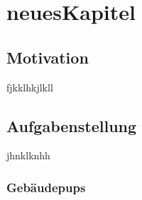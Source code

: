 \chapter{neuesKapitel}

\section{Motivation}
\label{sec:Sektion 1}
fjkklhkjlkll
\section{Aufgabenstellung}
\label{sec:Sektion 2}
jhnklknhh
\subsection{Gebäudepups}
